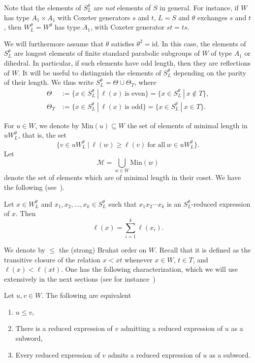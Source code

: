\documentclass[ALCO, Unicode]{cedram}
\begin{document}
Note that the elements of $S_L^\theta$ are \textit{not} elements of $S$ in general. For instance, if $W$ has type $A_1 \times A_1$ with Coxeter generators $s$ and $t$, $L=S$ and $\theta$ exchanges $s$ and $t$, then $W_L^\theta=W^\theta$ has type $A_1$, with Coxeter generator $st=ts$. 

We will furthermore assume that $\theta$ satisfies $\theta^2=\mathrm{id}$. In this case, the elements of $S_L^\theta$ are longest elements of finite standard parabolic subgroups of $W$ of type $A_1$ or dihedral. In particular, if such elements have odd length, then they are reflections of $W$. It will be useful to distinguish the elements of $S_L^\theta$ depending on the parity of their length. We thus write $S_L^\theta=\Theta\overset{\cdot}{\cup} \Theta_T$, where \begin{align*}\Theta&:=\{ x\in S_L^\theta~|~\ell(x)~\text{is even}\}=\{ x\in S_L^\theta~|~x\notin T\},\\
\Theta_T&:=\{ x\in S_L^\theta~|~\ell(x)~\text{is odd}\}=\{ x\in S_L^\theta~|~x\in T\}.\end{align*}

For $u\in W$, we denote by $\mathrm{Min}(u)\subseteq W$ the set of elements of minimal length in $u W_L^\theta$, that is, the set $$\{ v\in u W_L^\theta~|~\ell(w)\geq \ell(v)~\text{for all}~w\in u W_L^\theta\}.$$
Let $$\mathcal{M}=\bigcup_{w\in W} \mathrm{Min}(w)$$ denote the set of elements which are of minimal length in their coset. We have the following (see~\cite[Proposition 3.5]{muhlh}).
\begin{prop}\label{prop_muhlh}
Let $x\in W_L^\theta$ and $x_1, x_2, \dots, x_k\in S_L^\theta$ such that $x_1 x_2 \cdots x_k$ is an $S_L^\theta$-reduced expression of $x$. Then $$\ell(x)=\sum_{i=1}^k \ell(x_i).$$
\end{prop}


We denote by $\leq$ the (strong) Bruhat order on $W$. Recall that it is defined as the transitive closure of the relation $x < xt$ whenever $x\in W$, $t\in T$, and $\ell(x)<\ell(xt)$. One has the following characterization, which we will use extensively in the next sections (see for instance~\cite[Corollary 2.2.3]{BB})

\begin{prop}
Let $u,v\in W$. The following are equivalent
\begin{enumerate}
	\item $u \leq v$, 
	\item There is a reduced expression of $v$ admitting a reduced expression of $u$ as a subword, 
	\item Every reduced expression of $v$ admits a reduced expression of $u$ as a subword. 
\end{enumerate}
\end{prop}
\end{document}
